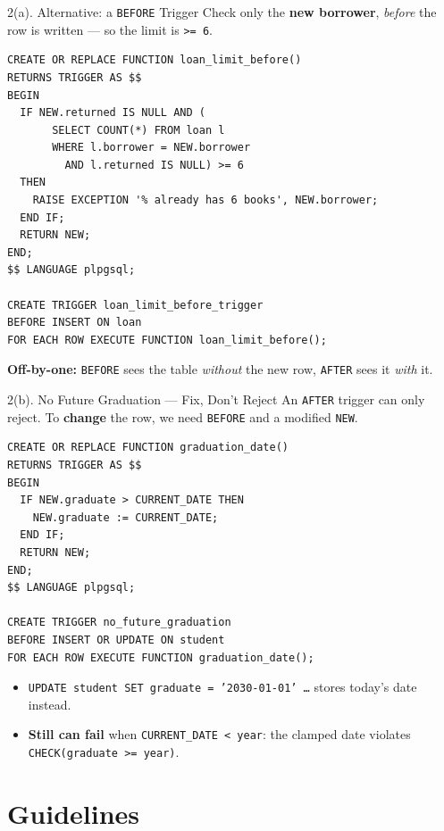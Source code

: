\documentclass{beamer}
\begin{document}
\begin{frame}[fragile]{2(a). Alternative: a \texttt{BEFORE} Trigger}
\footnotesize
Check only the \textbf{new borrower}, \emph{before} the row is written --- so the limit is \texttt{>= 6}.
\begin{lstlisting}[language=plpgsql]
CREATE OR REPLACE FUNCTION loan_limit_before()
RETURNS TRIGGER AS $$
BEGIN
  IF NEW.returned IS NULL AND (
       SELECT COUNT(*) FROM loan l
       WHERE l.borrower = NEW.borrower
         AND l.returned IS NULL) >= 6
  THEN
    RAISE EXCEPTION '% already has 6 books', NEW.borrower;
  END IF;
  RETURN NEW;
END;
$$ LANGUAGE plpgsql;

CREATE TRIGGER loan_limit_before_trigger
BEFORE INSERT ON loan
FOR EACH ROW EXECUTE FUNCTION loan_limit_before();
\end{lstlisting}
\textbf{Off-by-one:} \texttt{BEFORE} sees the table \emph{without} the new row, \texttt{AFTER} sees it \emph{with} it.
\end{frame}

\begin{frame}[fragile,shrink=3]{2(b). No Future Graduation --- Fix, Don't Reject}
\footnotesize
An \texttt{AFTER} trigger can only reject. To \textbf{change} the row, we need \texttt{BEFORE} and a modified \texttt{NEW}.
\begin{lstlisting}[language=plpgsql]
CREATE OR REPLACE FUNCTION graduation_date()
RETURNS TRIGGER AS $$
BEGIN
  IF NEW.graduate > CURRENT_DATE THEN
    NEW.graduate := CURRENT_DATE;
  END IF;
  RETURN NEW;
END;
$$ LANGUAGE plpgsql;

CREATE TRIGGER no_future_graduation
BEFORE INSERT OR UPDATE ON student
FOR EACH ROW EXECUTE FUNCTION graduation_date();
\end{lstlisting}
\begin{itemize}
  \item \texttt{UPDATE student SET graduate = '2030-01-01' \ldots} stores today's date instead.
  \item \textbf{Still can fail} when \texttt{CURRENT\_DATE < year}: the clamped date violates \texttt{CHECK(graduate >= year)}.
\end{itemize}
\end{frame}

\section{Guidelines}
\end{document}
